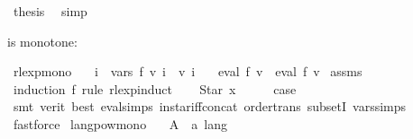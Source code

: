 \begin{isabellebody}
\ {\isacharquery}{\kern0pt}thesis\ \isamarkupfalse%
\ simp\isanewline
{}\isamarkupfalse%
%
\endisatagproof
{\isafoldproof}%
%
\isadelimproof
%
\endisadelimproof
%
\begin{isamarkuptext}%
 is monotone:%
\end{isamarkuptext}\isamarkuptrue%
\isamarkupfalse%
\ rlexp{\isacharunderscore}{\kern0pt}mono{\isacharcolon}{\kern0pt}\isanewline
\ \ \ {\isachardoublequoteopen}{\isasymforall}i\ {\isasymin}\ vars\ f{\isachardot}{\kern0pt}\ v\ i\ {\isasymsubseteq}\ v{\isacharprime}{\kern0pt}\ i{\isachardoublequoteclose}\isanewline
\ \ \ {\isachardoublequoteopen}eval\ f\ v\ {\isasymsubseteq}\ eval\ f\ v{\isacharprime}{\kern0pt}{\isachardoublequoteclose}\isanewline
%
\isadelimproof
%
\endisadelimproof
%
\isatagproof
{}\isamarkupfalse%
\ assms\ \isamarkupfalse%
\ {\isacharparenleft}{\kern0pt}induction\ f\ rule{\isacharcolon}{\kern0pt}\ rlexp{\isachardot}{\kern0pt}induct{\isacharparenright}{\kern0pt}\isanewline
\ \ \isamarkupfalse%
\ {\isacharparenleft}{\kern0pt}Star\ x{\isacharparenright}{\kern0pt}\isanewline
\ \ \isamarkupfalse%
\ \isamarkupfalse%
\ {\isacharquery}{\kern0pt}case\isanewline
\ \ \ \ \isamarkupfalse%
\ {\isacharparenleft}{\kern0pt}smt\ {\isacharparenleft}{\kern0pt}verit{\isacharcomma}{\kern0pt}\ best{\isacharparenright}{\kern0pt}\ eval{\isachardot}{\kern0pt}simps{\isacharparenleft}{\kern0pt}{}{\isacharparenright}{\kern0pt}\ in{\isacharunderscore}{\kern0pt}star{\isacharunderscore}{\kern0pt}iff{\isacharunderscore}{\kern0pt}concat\ order{\isacharunderscore}{\kern0pt}trans\ subsetI\ vars{\isachardot}{\kern0pt}simps{\isacharparenleft}{\kern0pt}{}{\isacharparenright}{\kern0pt}{\isacharparenright}{\kern0pt}\isanewline
{}\isamarkupfalse%
\ fastforce{\isacharplus}{\kern0pt}%
\endisatagproof
{\isafoldproof}%
%
\isadelimproof
%
\endisadelimproof
%
\isadelimdocument
%
\endisadelimdocument
%
\isatagdocument
%
\isamarkuptrue%
%
\endisatagdocument
{\isafolddocument}%
%
\isadelimdocument
%
\endisadelimdocument
{}\isamarkupfalse%
\ langpow{\isacharunderscore}{\kern0pt}mono{\isacharcolon}{\kern0pt}\isanewline
\ \ \ A\ {\isacharcolon}{\kern0pt}{\isacharcolon}{\kern0pt}\ {\isachardoublequoteopen}{\isacharprime}{\kern0pt}a\ lang{\isachardoublequoteclose}\isanewline

\end{isabellebody}
